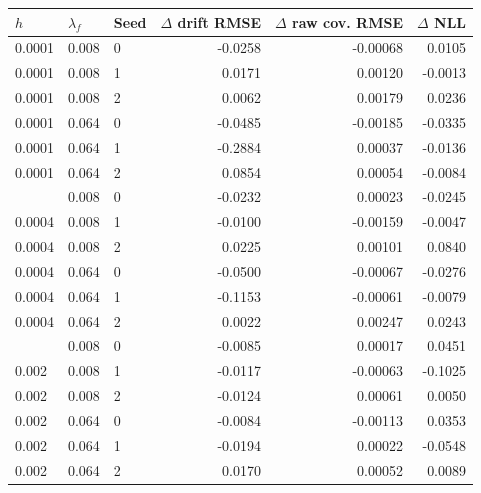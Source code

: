 \begin{tabular}{lllrrr}
\toprule
$h$ & $\lambda_f$ & Seed & $\Delta$ drift RMSE & $\Delta$ raw cov. RMSE & $\Delta$ NLL\\
\midrule
0.0001 & 0.008 & 0 & -0.0258 & -0.00068 & 0.0105\\
0.0001 & 0.008 & 1 & 0.0171 & 0.00120 & -0.0013\\
0.0001 & 0.008 & 2 & 0.0062 & 0.00179 & 0.0236\\
0.0001 & 0.064 & 0 & -0.0485 & -0.00185 & -0.0335\\
0.0001 & 0.064 & 1 & -0.2884 & 0.00037 & -0.0136\\
0.0001 & 0.064 & 2 & 0.0854 & 0.00054 & -0.0084\\
\addlinespace
0.0004 & 0.008 & 0 & -0.0232 & 0.00023 & -0.0245\\
0.0004 & 0.008 & 1 & -0.0100 & -0.00159 & -0.0047\\
0.0004 & 0.008 & 2 & 0.0225 & 0.00101 & 0.0840\\
0.0004 & 0.064 & 0 & -0.0500 & -0.00067 & -0.0276\\
0.0004 & 0.064 & 1 & -0.1153 & -0.00061 & -0.0079\\
0.0004 & 0.064 & 2 & 0.0022 & 0.00247 & 0.0243\\
\addlinespace
0.002 & 0.008 & 0 & -0.0085 & 0.00017 & 0.0451\\
0.002 & 0.008 & 1 & -0.0117 & -0.00063 & -0.1025\\
0.002 & 0.008 & 2 & -0.0124 & 0.00061 & 0.0050\\
0.002 & 0.064 & 0 & -0.0084 & -0.00113 & 0.0353\\
0.002 & 0.064 & 1 & -0.0194 & 0.00022 & -0.0548\\
0.002 & 0.064 & 2 & 0.0170 & 0.00052 & 0.0089\\
\bottomrule
\end{tabular}

